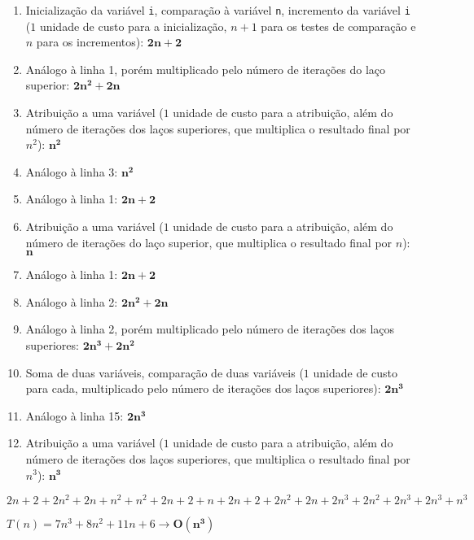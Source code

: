 \documentclass{sftex/sftex}
\begin{document}
\begin{enumerate}[label=Linha \arabic*:]

    \item Inicialização da variável \texttt{i}, comparação à variável
        \texttt{n}, incremento da variável \texttt{i} ($1$ unidade de custo
        para a inicialização, $n + 1$ para os testes de comparação e $n$
        para os incrementos): $\mathbf{2n + 2}$

    \item Análogo à linha 1, porém multiplicado pelo número de iterações
        do laço superior: $\mathbf{2n^2 + 2n}$

    \item Atribuição a uma variável ($1$ unidade de custo para a atribuição,
        além do número de iterações dos laços superiores, que multiplica o
        resultado final por $n^2$): $\mathbf{n^2}$

    \item Análogo à linha 3: $\mathbf{n^2}$ \addtocounter{enumi}{3}

    \item Análogo à linha 1: $\mathbf{2n + 2}$

    \item Atribuição a uma variável ($1$ unidade de custo para a atribuição,
        além do número de iterações do laço superior, que multiplica o
        resultado final por $n$): $\mathbf{n}$ \addtocounter{enumi}{2}

    \item Análogo à linha 1: $\mathbf{2n + 2}$

    \item Análogo à linha 2: $\mathbf{2n^2 + 2n}$

    \item Análogo à linha 2, porém multiplicado pelo número de iterações
        dos laços superiores: $\mathbf{2n^3 + 2n^2}$

    \item Soma de duas variáveis, comparação de duas variáveis ($1$ unidade
        de custo para cada, multiplicado pelo número de iterações dos laços
        superiores): $\mathbf{2n^3}$

    \item Análogo à linha 15: $\mathbf{2n^3}$

    \item Atribuição a uma variável ($1$ unidade de custo para a atribuição,
        além do número de iterações dos laços superiores, que multiplica o
        resultado final por $n^3$): $\mathbf{n^3}$

\end{enumerate}

$2n + 2 + 2n^2 + 2n + n^2 + n^2 + 2n + 2 + n + 2n + 2 + 2n^2 + 2n + 2n^3
+ 2n^2 + 2n^3 + 2n^3 + n^3$

$T(n) = 7n^3 + 8n^2 + 11n + 6 \rightarrow \mathbf{O(n^3)}$
\end{document}
